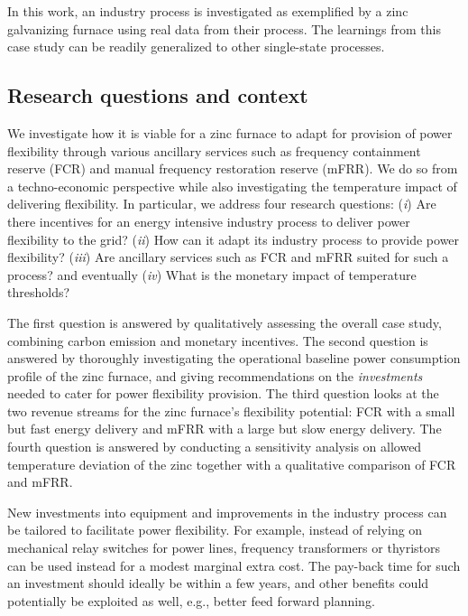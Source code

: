 \documentclass[sigconf]{acmart}
\begin{document}
In this work, an industry process is investigated as exemplified by a zinc galvanizing furnace using real data from their process. The learnings from this case study can be readily generalized to other single-state processes.


\subsection{Research questions and context}

We investigate how it is viable for a zinc furnace to adapt for provision of power flexibility through various ancillary services such as frequency containment reserve (FCR) and manual frequency restoration reserve (mFRR). We do so from a techno-economic perspective while also investigating the temperature impact of delivering flexibility. In particular, we address four research questions: (\textit{i}) Are there incentives for an energy intensive industry process to deliver power flexibility to the grid? (\textit{ii}) How can it adapt its industry process to provide power flexibility? (\textit{iii}) Are ancillary services such as FCR and mFRR suited for such a process? and eventually (\textit{iv})  What is the monetary impact of temperature thresholds?

The first question is answered by qualitatively assessing the overall case study, combining carbon emission and monetary incentives. The second question is answered by thoroughly investigating the operational baseline power consumption profile of the zinc furnace, and giving recommendations on the \textit{investments} needed to cater for power flexibility provision. The third question looks at the two revenue streams for the zinc furnace's flexibility potential: FCR with a small but fast energy delivery and mFRR with a large but slow energy delivery. The fourth question is answered by conducting a sensitivity analysis on allowed temperature deviation of the zinc together with a qualitative comparison of FCR and mFRR.



New investments into equipment and improvements in the industry process can be tailored to facilitate power flexibility. For example, instead of relying on mechanical relay switches for power lines, frequency transformers or thyristors can be used instead for a modest marginal extra cost. The pay-back time for such an investment should ideally be within a few years, and other benefits could potentially be exploited as well, e.g., better feed forward planning.
\end{document}
